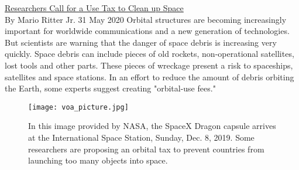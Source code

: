\href{https://www.51voa.com/VOA_Special_English/researchers-call-for-a-use-tax-to-clean-up-space-84650.html}{Researchers Call for a Use Tax to Clean up Space} \\

By Mario Ritter Jr.
31 May 2020
Orbital structures are becoming increasingly important for worldwide communications and a new generation of technologies. But scientists are warning that the danger of space debris is increasing very quickly.
Space debris can include pieces of old rockets, non-operational satellites, lost tools and other parts. These pieces of wreckage present a risk to spaceships, satellites and space stations. 
In an effort to reduce the amount of debris orbiting the Earth, some experts suggest creating "orbital-use fees."

\begin{figure}[h] %
    \centering
    \texttt{[image: voa\_picture.jpg]}
    \caption{In this image provided by NASA, the SpaceX Dragon capsule arrives at the International Space Station, Sunday, Dec. 8, 2019. Some researchers are proposing an orbital tax to prevent countries from launching too many objects into space.}
\end{figure}

